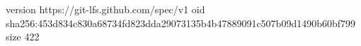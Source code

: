 version https://git-lfs.github.com/spec/v1
oid sha256:453d834c830a68734fd823dda29073135b4b47889091c507b09d1490b60bf799
size 422
